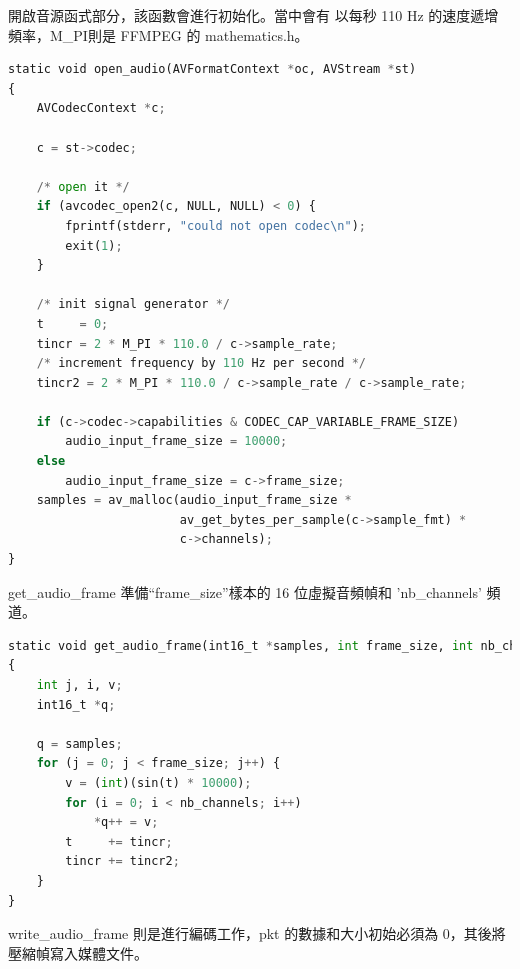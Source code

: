 \documentclass[10pt,UTF8]{ctexart}
\begin{document}
開啟音源函式部分，該函數會進行初始化。當中會有 以每秒 110 Hz 的速度遞增頻率，M\_PI則是 FFMPEG 的 mathematics.h。

\begin{lstlisting}[language={python}]
static void open_audio(AVFormatContext *oc, AVStream *st)
{
    AVCodecContext *c;

    c = st->codec;

    /* open it */
    if (avcodec_open2(c, NULL, NULL) < 0) {
        fprintf(stderr, "could not open codec\n");
        exit(1);
    }

    /* init signal generator */
    t     = 0;
    tincr = 2 * M_PI * 110.0 / c->sample_rate;
    /* increment frequency by 110 Hz per second */
    tincr2 = 2 * M_PI * 110.0 / c->sample_rate / c->sample_rate;

    if (c->codec->capabilities & CODEC_CAP_VARIABLE_FRAME_SIZE)
        audio_input_frame_size = 10000;
    else
        audio_input_frame_size = c->frame_size;
    samples = av_malloc(audio_input_frame_size *
                        av_get_bytes_per_sample(c->sample_fmt) *
                        c->channels);
}
\end{lstlisting}

get\_audio\_frame 準備“frame\_size”樣本的 16 位虛擬音頻幀和 'nb\_channels' 頻道。

\begin{lstlisting}[language={python}]
static void get_audio_frame(int16_t *samples, int frame_size, int nb_channels)
{
    int j, i, v;
    int16_t *q;

    q = samples;
    for (j = 0; j < frame_size; j++) {
        v = (int)(sin(t) * 10000);
        for (i = 0; i < nb_channels; i++)
            *q++ = v;
        t     += tincr;
        tincr += tincr2;
    }
}
\end{lstlisting}

write\_audio\_frame 則是進行編碼工作，pkt 的數據和大小初始必須為 0，其後將壓縮幀寫入媒體文件。
\end{document}
